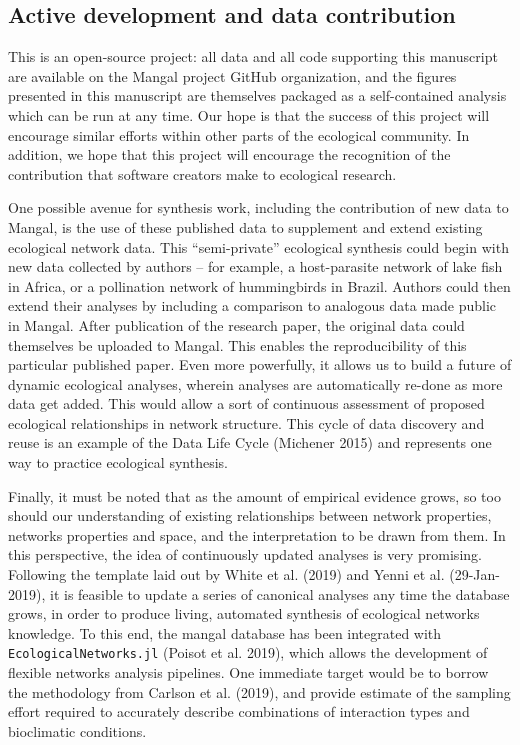 \documentclass[11pt]{article}
\begin{document}
\hypertarget{active-development-and-data-contribution}{%
\subsection{Active development and data
contribution}\label{active-development-and-data-contribution}}

This is an open-source project: all data and all code supporting this
manuscript are available on the Mangal project GitHub organization, and
the figures presented in this manuscript are themselves packaged as a
self-contained analysis which can be run at any time. Our hope is that
the success of this project will encourage similar efforts within other
parts of the ecological community. In addition, we hope that this
project will encourage the recognition of the contribution that software
creators make to ecological research.

One possible avenue for synthesis work, including the contribution of
new data to Mangal, is the use of these published data to supplement and
extend existing ecological network data. This ``semi-private''
ecological synthesis could begin with new data collected by authors --
for example, a host-parasite network of lake fish in Africa, or a
pollination network of hummingbirds in Brazil. Authors could then extend
their analyses by including a comparison to analogous data made public
in Mangal. After publication of the research paper, the original data
could themselves be uploaded to Mangal. This enables the reproducibility
of this particular published paper. Even more powerfully, it allows us
to build a future of dynamic ecological analyses, wherein analyses are
automatically re-done as more data get added. This would allow a sort of
continuous assessment of proposed ecological relationships in network
structure. This cycle of data discovery and reuse is an example of the
Data Life Cycle (Michener 2015) and represents one way to practice
ecological synthesis.

Finally, it must be noted that as the amount of empirical evidence
grows, so too should our understanding of existing relationships between
network properties, networks properties and space, and the
interpretation to be drawn from them. In this perspective, the idea of
continuously updated analyses is very promising. Following the template
laid out by White et al. (2019) and Yenni et al. (29-Jan-2019), it is
feasible to update a series of canonical analyses any time the database
grows, in order to produce living, automated synthesis of ecological
networks knowledge. To this end, the mangal database has been integrated
with \texttt{EcologicalNetworks.jl} (Poisot et al. 2019), which allows
the development of flexible networks analysis pipelines. One immediate
target would be to borrow the methodology from Carlson et al. (2019),
and provide estimate of the sampling effort required to accurately
describe combinations of interaction types and bioclimatic conditions.
\end{document}
